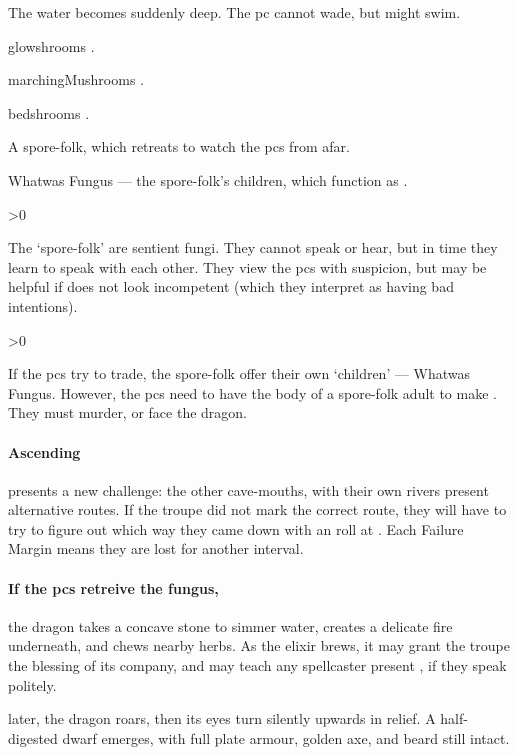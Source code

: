 \documentclass[10pt,twoside]{book}
\begin{document}
{
  \footnotesize
  \begin{dlist}
    \item
    The water becomes suddenly deep.
    The \gls{pc} cannot wade, but might swim.
    \item
    \Glspl{glowshroom} .
    \item
    \Glspl{marchingMushroom} .
    \item
    \Glspl{bedshroom} .
    \item
    A spore-folk, which retreats to watch the \glspl{pc} from afar.
    \item
    Whatwas Fungus --- the spore-folk's children, which function as .
  \end{dlist}
}

\randomize

\sporeFolk

\ifnum\value{Charisma}>0
  {\small{}}
\fi

\noindent
The `spore-folk' are sentient fungi.
They cannot speak or hear, but in time they learn to speak with each other.
They view the \glspl{pc} with suspicion, but may be helpful if  does not look incompetent (which they interpret as having bad intentions).

\sporeFolk

\ifnum\value{Charisma}>0
  {\small{}}
\fi

\wotWosFungus

\noindent
If the \glspl{pc} try to trade, the spore-folk offer their own `children' --- Whatwas Fungus.
However, the \glspl{pc} need to have the body of a spore-folk adult to make .
They must murder, or face the dragon.

\showTalisman


\paragraph{Ascending}
presents a new challenge: the other cave-mouths, with their own rivers present alternative routes.
If the troupe did not mark the correct route, they will have to try to figure out which way they came down with an  roll at \tn[10].
Each Failure Margin means they are lost for another \gls{interval}.

\paragraph{If the \glspl{pc} retreive the fungus,}
the dragon takes a concave stone to simmer water, creates a delicate fire underneath, and chews nearby herbs.
As the \gls{elixir} brews, it may grant the troupe the blessing of its company, and may teach any spellcaster present , if they speak politely.

 later, the dragon roars, then its eyes turn silently upwards in relief.
A half-digested dwarf emerges, with full plate armour, golden axe, and beard still intact.
\end{document}
